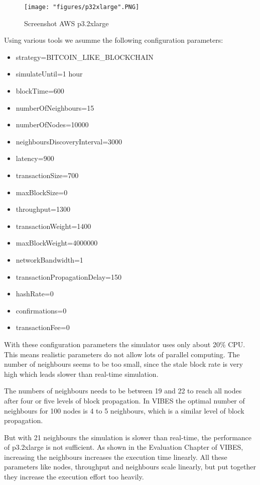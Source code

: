 \begin{figure}[h]
\centering
\texttt{[image: "figures/p32xlarge".PNG]}
\caption{Screenshot AWS p3.2xlarge
\label{fig:aws}}
\end{figure}

Using various tools we asumme the following configuration parameters:
\begin{itemize}
\item strategy=BITCOIN\_LIKE\_BLOCKCHAIN
\item simulateUntil={1 hour}
\item blockTime=600
\item numberOfNeighbours=15
\item numberOfNodes=10000 \cite{configuration_node}
\item neighboursDiscoveryInterval=3000
\item latency=900
\item transactionSize=700 \cite{configuration_transaction_size}
\item maxBlockSize=0
\item throughput=1300 \cite{configuration_tpb}
\item transactionWeight=1400
\item maxBlockWeight=4000000
\item networkBandwidth=1
\item transactionPropagationDelay=150
\item hashRate=0
\item confirmations=0
\item transactionFee=0
\end{itemize}

With these configuration parameters the simulator uses only about 20\% CPU. This means realistic parameters do not allow lots of parallel computing. The number of neighbours seems to be too small, since the stale block rate is very high which leads slower than real-time simulation.

The numbers of neighbours needs to be between 19 and 22 to reach all nodes after four or five levels of block propagation. In VIBES the optimal number of neighbours for 100 nodes is 4 to 5 neighbours, which is a similar level of block propagation.

But with 21 neighbours the simulation is slower than real-time, the performance of p3.2xlarge is not sufficient. As shown in the Evaluation Chapter of VIBES, increasing the neighbours increases the execution time linearly. All these parameters like nodes, throughput and neighbours scale linearly, but put together they increase the execution effort too heavily.

